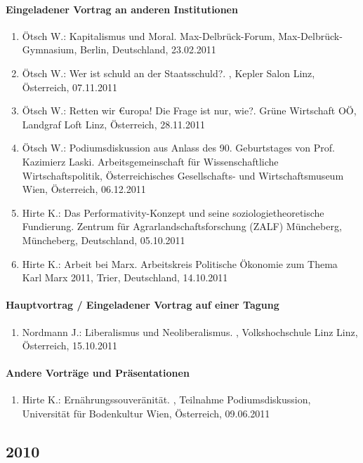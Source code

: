\paragraph{Eingeladener Vortrag an anderen Institutionen}
\begin{enumerate}
	\item Ötsch W.: Kapitalismus und Moral. Max-Delbrück-Forum, Max-Delbrück-Gymnasium, Berlin, Deutschland, 23.02.2011
	\item Ötsch W.: Wer ist schuld an der Staatsschuld?. , Kepler Salon Linz, Österreich, 07.11.2011
	\item Ötsch W.: Retten wir €uropa! Die Frage ist nur, wie?. Grüne Wirtschaft OÖ, Landgraf Loft Linz, Österreich, 28.11.2011
	\item Ötsch W.: Podiumsdiskussion aus Anlass des 90. Geburtstages von Prof. Kazimierz Laski. Arbeitsgemeinschaft für Wissenschaftliche Wirtschaftspolitik, Österreichisches Gesellschafts- und Wirtschaftsmuseum Wien, Österreich, 06.12.2011
	\item Hirte K.: Das Performativity-Konzept und seine soziologietheoretische Fundierung. Zentrum für Agrarlandschaftsforschung (ZALF) Müncheberg, Müncheberg, Deutschland, 05.10.2011
	\item Hirte K.: Arbeit bei Marx. Arbeitskreis Politische Ökonomie zum Thema \glqq Karl Marx 2011\grqq{}, Trier, Deutschland, 14.10.2011
\end{enumerate}
\paragraph{Hauptvortrag / Eingeladener Vortrag auf einer Tagung}
\begin{enumerate}
	\item Nordmann J.: Liberalismus und Neoliberalismus. , Volkshochschule Linz Linz, Österreich, 15.10.2011
\end{enumerate}
\paragraph{Andere Vorträge und Präsentationen}
\begin{enumerate}
	\item Hirte K.: Ernährungssouveränität. , Teilnahme Podiumsdiskussion, Universität für Bodenkultur Wien, Österreich, 09.06.2011
\end{enumerate}
\subsection*{2010}
